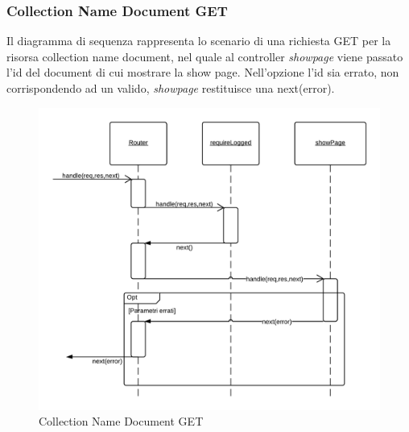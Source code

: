 \subsubsection{Collection Name Document GET} 
Il diagramma di sequenza rappresenta lo scenario di una richiesta GET per la risorsa collection name document, nel quale al controller \emph{showpage} viene passato l'id del document di cui mostrare la show page.
Nell'opzione l'id sia errato, non corrispondendo ad un  valido, \emph{showpage} restituisce una next(error).
\begin{figure}[H]
	\begin{center} 
		\includegraphics[scale=0.20]{scenari/Collection Name Document GET.png} 
		\caption{Collection Name Document GET}
	\end{center} 
\end{figure}

